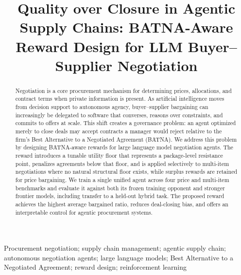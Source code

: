 \documentclass{interact}
\theoremstyle{plain}
\theoremstyle{definition}
\theoremstyle{remark}
\begin{document}

\title{Quality over Closure in Agentic Supply Chains: BATNA-Aware Reward Design for LLM Buyer--Supplier Negotiation}


\author{
}

\maketitle

\begin{abstract}
Negotiation is a core procurement mechanism for determining prices, allocations, and contract terms when private information is present. As artificial intelligence moves from decision support to autonomous agency, buyer--supplier bargaining can increasingly be delegated to software that converses, reasons over constraints, and commits to offers at scale. This shift creates a governance problem: an agent optimized merely to close deals may accept contracts a manager would reject relative to the firm's Best Alternative to a Negotiated Agreement (BATNA). We address this problem by designing BATNA-aware rewards for large language model negotiation agents. The reward introduces a tunable utility floor that represents a package-level resistance point, penalizes agreements below that floor, and is applied selectively to multi-item negotiations where no natural structural floor exists, while surplus rewards are retained for price bargaining. We train a single unified agent across four price and multi-item benchmarks and evaluate it against both its frozen training opponent and stronger frontier models, including transfer to a held-out hybrid task. The proposed reward achieves the highest average bargained ratio, reduces deal-closing bias, and offers an interpretable control for agentic procurement systems.
\end{abstract}

\begin{keywords}
Procurement negotiation; supply chain management; agentic supply chain; autonomous negotiation agents; large language models; Best Alternative to a Negotiated Agreement; reward design; reinforcement learning
\end{keywords}
\end{document}
